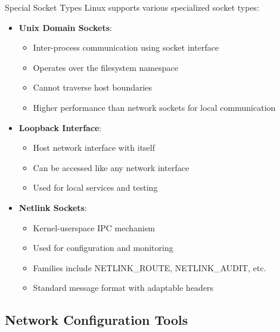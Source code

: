 \begin{concept}{Special Socket Types}
    Linux supports various specialized socket types:
    \begin{itemize}
        \item \textbf{Unix Domain Sockets}:
            \begin{itemize}
                \item Inter-process communication using socket interface
                \item Operates over the filesystem namespace
                \item Cannot traverse host boundaries
                \item Higher performance than network sockets for local communication
            \end{itemize}
        \item \textbf{Loopback Interface}:
            \begin{itemize}
                \item Host network interface with itself
                \item Can be accessed like any network interface
                \item Used for local services and testing
            \end{itemize}
        \item \textbf{Netlink Sockets}:
            \begin{itemize}
                \item Kernel-userspace IPC mechanism
                \item Used for configuration and monitoring
                \item Families include NETLINK\_ROUTE, NETLINK\_AUDIT, etc.
                \item Standard message format with adaptable headers
            \end{itemize}
    \end{itemize}
\end{concept}


\raggedcolumns
\columnbreak


\subsection{Network Configuration Tools}

